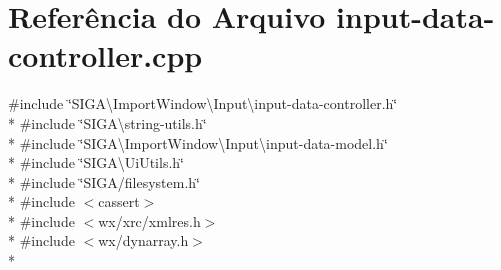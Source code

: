 \section{Referência do Arquivo input-\/data-\/controller.cpp}
\label{input-data-controller_8cpp}
{\ttfamily \#include \char`\"{}S\+I\+G\+A\textbackslash{}\+Import\+Window\textbackslash{}\+Input\textbackslash{}input-\/data-\/controller.\+h\char`\"{}}\\*
{\ttfamily \#include \char`\"{}S\+I\+G\+A\textbackslash{}string-\/utils.\+h\char`\"{}}\\*
{\ttfamily \#include \char`\"{}S\+I\+G\+A\textbackslash{}\+Import\+Window\textbackslash{}\+Input\textbackslash{}input-\/data-\/model.\+h\char`\"{}}\\*
{\ttfamily \#include \char`\"{}S\+I\+G\+A\textbackslash{}\+Ui\+Utils.\+h\char`\"{}}\\*
{\ttfamily \#include \char`\"{}S\+I\+G\+A/filesystem.\+h\char`\"{}}\\*
{\ttfamily \#include $<$cassert$>$}\\*
{\ttfamily \#include $<$wx/xrc/xmlres.\+h$>$}\\*
{\ttfamily \#include $<$wx/dynarray.\+h$>$}\\*
